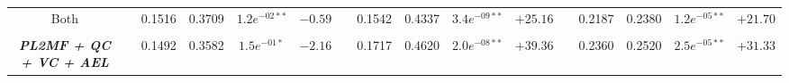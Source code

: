 \begin{table*}
{\begin{tabular}{cc@{\hs}rrccc@{\hs}rrccc@{\hs}rrcc}
                          \\
{\raggedright Both} & \phantom{a} & 0.1516 & 0.3709 & $1.2e^{-02**}$ & $-0.59$
                    & \phantom{a} & 0.1542 & 0.4337 & $3.4e^{-09**}$ & $+25.16$
                    & \phantom{a} & 0.2187 & 0.2380 & $1.2e^{-05**}$ & $+21.70$
        \\
\\
\emph{\textbf{PL2MF + QC + VC + AEL}} & \phantom{a} & 0.1492 & 0.3582 & $1.5e^{-01*}$ & $-2.16$
                                      & \phantom{a} & 0.1717 & 0.4620 & $2.0e^{-08**}$ & $+39.36$
                                      & \phantom{a} & 0.2360 & 0.2520 & $2.5e^{-05**}$ & $+31.33$ \\
\bottomrule
\end{tabular}}
\end{table*}
